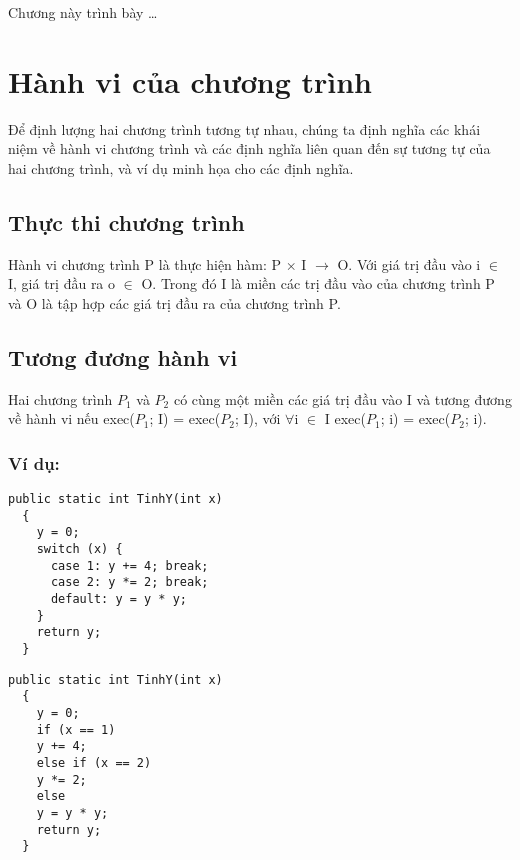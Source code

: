 Chương này trình bày \dots

\section{Hành vi của chương trình}
	
Để định lượng hai chương trình tương tự nhau, chúng ta định nghĩa các khái niệm về hành vi chương trình và các định nghĩa liên quan đến sự tương tự của hai chương trình, và ví dụ minh họa cho các định nghĩa. 
	
\subsection{Thực thi chương trình}

\begin{definition}\label{def:progexe}
Hành vi chương trình P là thực hiện hàm: P $\times$ I $\rightarrow$ O. Với giá trị đầu vào i $\in$ I, giá trị đầu ra o $\in$ O. Trong đó I là miền các trị đầu vào của chương trình P và O là tập hợp các giá trị đầu ra của chương trình P.  
\end{definition}
	
\subsection{Tương đương hành vi}

\begin{definition}
  Hai chương trình $P_{1}$ và $P_{2}$ có cùng một miền các giá trị đầu
  vào I và tương đương về hành vi nếu exec($P_{1}$; I) = exec($P_{2}$;
  I), với $\forall$i $\in$ I exec($P_{1}$; i) = exec($P_{2}$; i).
\end{definition}
	
\subsubsection{Ví dụ:}


\begin{lstlisting}[language={[Sharp]C}, caption={Tính y, sử dụng hàm switch...case}, label={Script}]
  public static int TinhY(int x)
  {
    y = 0;
    switch (x) {
      case 1: y += 4; break;
      case 2: y *= 2; break;
      default: y = y * y;
    }
    return y;
  }
\end{lstlisting}


\begin{lstlisting}[language={[Sharp]C}, caption={Tính y, sử dụng hàm If...else}, label={Script}]
  public static int TinhY(int x)
  {
    y = 0;
    if (x == 1)
    y += 4;
    else if (x == 2)
    y *= 2;
    else
    y = y * y;
    return y;
  }
\end{lstlisting}

